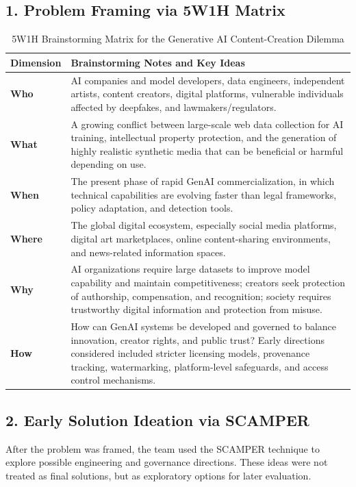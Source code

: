 \subsection*{1. Problem Framing via 5W1H Matrix}
\begin{table}[h]
    \centering
    \renewcommand{\arraystretch}{1.5}
    \begin{tabular}{|p{2.2cm}|p{11.6cm}|}
        \hline
        \textbf{Dimension} & \textbf{Brainstorming Notes and Key Ideas} \\
        \hline
        \textbf{Who} & AI companies and model developers, data engineers, independent artists, content creators, digital platforms, vulnerable individuals affected by deepfakes, and lawmakers/regulators. \\
        \hline
        \textbf{What} & A growing conflict between large-scale web data collection for AI training, intellectual property protection, and the generation of highly realistic synthetic media that can be beneficial or harmful depending on use. \\
        \hline
        \textbf{When} & The present phase of rapid GenAI commercialization, in which technical capabilities are evolving faster than legal frameworks, policy adaptation, and detection tools. \\
        \hline
        \textbf{Where} & The global digital ecosystem, especially social media platforms, digital art marketplaces, online content-sharing environments, and news-related information spaces. \\
        \hline
        \textbf{Why} & AI organizations require large datasets to improve model capability and maintain competitiveness; creators seek protection of authorship, compensation, and recognition; society requires trustworthy digital information and protection from misuse. \\
        \hline
        \textbf{How} & How can GenAI systems be developed and governed to balance innovation, creator rights, and public trust? Early directions considered included stricter licensing models, provenance tracking, watermarking, platform-level safeguards, and access control mechanisms. \\
        \hline
    \end{tabular}
    \caption{5W1H Brainstorming Matrix for the Generative AI Content-Creation Dilemma}
    \label{tab:5w1h}
\end{table}

\subsection*{2. Early Solution Ideation via SCAMPER}
After the problem was framed, the team used the SCAMPER technique to explore possible engineering and governance directions. These ideas were not treated as final solutions, but as exploratory options for later evaluation.

